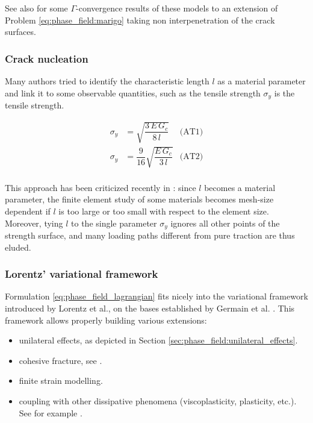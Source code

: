 See also \cite{chambolle_approximation_2018} for some \(\Gamma\)-convergence
results of these models to an extension of Problem \eqref{eq:phase_field:marigo}
taking non interpenetration of the crack surfaces.

\subsubsection{Crack nucleation}
\label{sec:phase_field:crack_nucleation}

Many authors tried to identify the characteristic length \(l\) as a
material parameter and link it to some observable quantities, such as
the tensile strength \(\sigma_{y}\) is the tensile strength.

\[
\begin{aligned}
\sigma_{y}&=\sqrt{\dfrac{3\,E\,G_{c}}{8\,l}}&\text{(AT1)}\\
\sigma_{y}&=\dfrac{9}{16}\sqrt{\dfrac{E\,G_{c}}{3\,l}}&\text{(AT2)}\\
\end{aligned}
\]

This approach has been criticized recently in \cite{kumar_revisiting_2020} :
since $l$ becomes a material parameter, the finite element study of some
materials becomes mesh-size dependent if $l$ is too large or too small
with respect to the element size. Moreover, tying $l$ to the single
parameter $\sigma_y$ ignores all other points of the strength surface,
and many loading paths different from pure traction are thus eluded.

\subsubsection{Lorentz' variational framework}
\label{sec:phase_field:lorentz_variational_framework}

Formulation \eqref{eq:phase_field_lagrangian} fits nicely into the variational
framework introduced by Lorentz et al., on the bases established by
Germain et al.
\cite{germain_continuum_1983, lorentz_variational_1999, lorentz_analysis_2003, forest_localization_2004}.
This framework allows properly building various extensions:

\begin{itemize}
    \item unilateral effects, as depicted in Section
    \ref{sec:phase_field:unilateral_effects}.
    \item cohesive fracture, see
    \cite{lorentz_convergence_2011, lorentz_nonlocal_2017}.
    \item finite strain modelling.
    \item coupling with other dissipative phenomena (viscoplasticity,
    plasticity, etc.). See for example
    \cite{zhang_modelisation_2016, crabbe_gradient_2018}.
\end{itemize}

